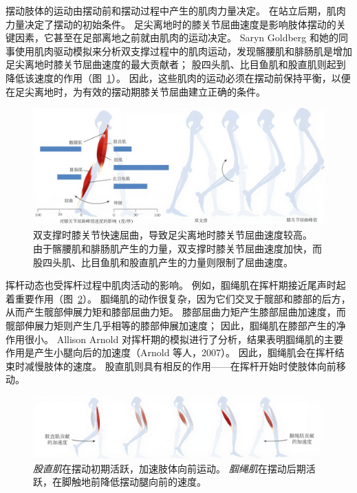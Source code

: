摆动肢体的运动由摆动前和摆动过程中产生的肌肉力量决定。
在站立后期，肌肉力量决定了摆动的初始条件。
足尖离地时的膝关节屈曲速度是影响肢体摆动的关键因素，它甚至在足部离地之前就由肌肉的运动决定。
Saryn Goldberg 和她的同事使用肌肉驱动模拟来分析双支撑过程中的肌肉运动，发现髂腰肌和腓肠肌是增加足尖离地时膝关节屈曲速度的最大贡献者；
股四头肌、比目鱼肌和股直肌则起到降低该速度的作用（图~\ref{fig:11_4}）。
因此，这些肌肉的运动必须在摆动前保持平衡，以便在足尖离地时，为有效的摆动期膝关节屈曲建立正确的条件。


\begin{figure}[!htb]
	\centering
	\includegraphics[width=1.0\linewidth]{chap11/11_4}
	\caption{双支撑时膝关节快速屈曲，导致足尖离地时膝关节屈曲速度较高。
		由于髂腰肌和腓肠肌产生的力量，双支撑时膝关节屈曲速度加快，而股四头肌、比目鱼肌和股直肌产生的力量则限制了屈曲速度\cite{goldberg2004muscles}。 \label{fig:11_4}}
\end{figure}


挥杆动态也受挥杆过程中肌肉活动的影响。
例如，腘绳肌在挥杆期接近尾声时起着重要作用（图~\ref{fig:11_5}）。
腘绳肌的动作很复杂，因为它们交叉于髋部和膝部的后方，从而产生髋部伸展力矩和膝部屈曲力矩。
膝部屈曲力矩产生膝部屈曲加速度，而髋部伸展力矩则产生几乎相等的膝部伸展加速度；
因此，腘绳肌在膝部产生的净作用很小。
Allison Arnold 对挥杆期的模拟进行了分析，结果表明腘绳肌的主要作用是产生小腿向后的加速度（Arnold 等人，2007）。
因此，腘绳肌会在挥杆结束时减慢肢体的速度。
股直肌则具有相反的作用——在挥杆开始时使肢体向前移动。


\begin{figure}[!htb]
	\centering
	\includegraphics[width=1.0\linewidth]{chap11/11_5}
	\caption{\textit{股直肌}在摆动初期活跃，加速肢体向前运动。
		\textit{腘绳肌}在摆动后期活跃，在脚触地前降低摆动腿向前的速度。 \label{fig:11_5}}
\end{figure}


